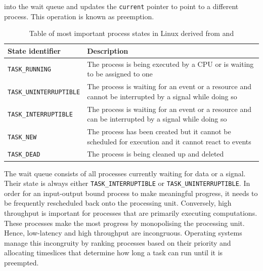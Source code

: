 into the wait queue and updates the \verb|current| pointer to point to a different process. 
This operation is known as preemption. 
\begin{table}[h!]
    \centering
    \begin{tabular}{ |m{4cm}|m{20em}| }
        \hline
        State identifier & Description \\
        \hline
        \verb|TASK_RUNNING| & The process is being executed by a CPU or is waiting to be assigned to one \\
        \hline 
        \verb|TASK_UNINTERRUPTIBLE| & The process is waiting for an event or a resource and cannot be interrupted by a signal while doing so \\
        \hline
        \verb|TASK_INTERRUPTIBLE| & The process is waiting for an event or a resource and can be interrupted by a signal while doing so \\
        \hline
        \verb|TASK_NEW| & The process has been created but it cannot be scheduled for execution and it cannot react to events \\
        \hline
        \verb|TASK_DEAD| & The process is being cleaned up and deleted \\
        \hline
    \end{tabular}
    \caption{Table of most important process states in Linux derived from \cite{include/linux/sched.h} and \cite{kernel/sched/core.c}}
    \label{table:proc-states}
\end{table}
The wait queue consists of all processes currently waiting for data or a signal.
Their state is always either \verb|TASK_INTERRUPTIBLE| or \verb|TASK_UNINTERRUPTIBLE|.
In order for an input-output bound process to make meaningful progress, it needs to be frequently 
rescheduled back onto the processing unit. 
Conversely, high throughput is important for processes that are primarily executing computations.
These processes make the most progress by monopolising the processing unit. Hence, 
low-latency and high throughput are incongruous. Operating systems manage 
this incongruity by ranking processes based on their priority and allocating timeslices that 
determine how long a task can run until it is preempted. 

